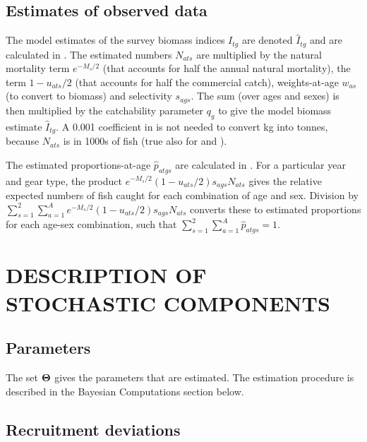 

\subsection{Estimates of observed data}

The model estimates of the survey biomass indices $I_{tg}$ are denoted $\widehat{I}_{tg}$ and are calculated in . The estimated numbers $N_{ats}$ are multiplied by the natural mortality term $e^{-M_s / 2}$ (that accounts for half the annual natural mortality), the term $1 - u_{ats} / 2$ (that accounts for half the commercial catch),  weights-at-age $w_{as}$ (to convert to biomass) and selectivity $s_{ags}$. The sum (over ages and sexes) is then multiplied by the catchability parameter $q_g$ to give the model biomass estimate $\widehat{I}_{tg}$. A 0.001 coefficient in  is not needed to convert kg into tonnes, because $N_{ats}$ is in 1000s of fish (true also for  and ).

The estimated proportions-at-age $\widehat{p}_{atgs}$ are calculated in . For a particular year and gear type, the product $e^{-M_{s}/2} (1 - u_{ats}/2)  s_{ags} N_{ats}$ gives the relative expected numbers of fish caught for each combination of age and sex. Division by $\sum_{s=1}^2 \sum_{a=1}^A e^{-M_{s}/2} (1 - u_{ats}/2)  s_{ags} N_{ats}$ converts these to estimated proportions for each age-sex combination, such that $\sum_{s=1}^2 \sum_{a=1}^{A} \widehat{p}_{atgs} = 1$.

\section{DESCRIPTION OF STOCHASTIC COMPONENTS}

\subsection{Parameters}

The set ${\bf \Theta}$ gives the parameters that are estimated. The estimation procedure is described in the Bayesian Computations section below.


\subsection{Recruitment deviations}

